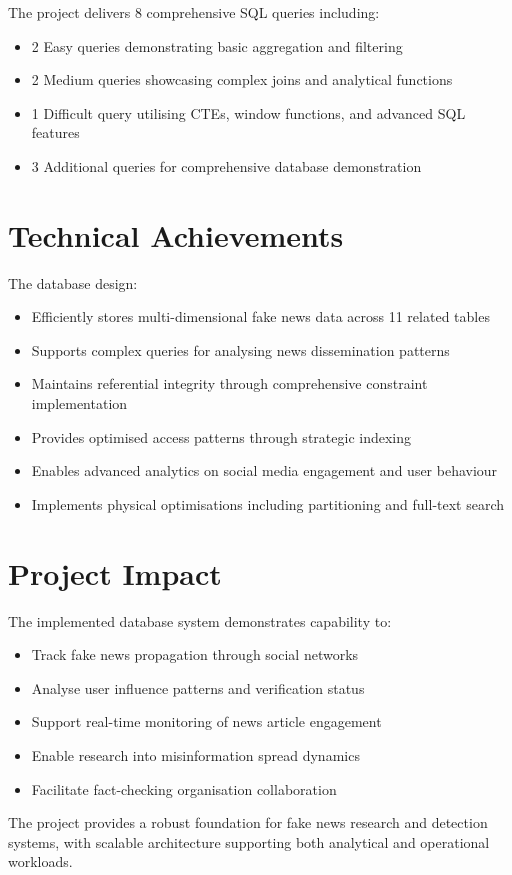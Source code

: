 \documentclass[12pt,a4paper]{report}
\begin{document}
The project delivers 8 comprehensive SQL queries including:
\begin{itemize}
    \item 2 Easy queries demonstrating basic aggregation and filtering
    \item 2 Medium queries showcasing complex joins and analytical functions
    \item 1 Difficult query utilising CTEs, window functions, and advanced SQL features
    \item 3 Additional queries for comprehensive database demonstration
\end{itemize}

\section{Technical Achievements}

The database design:
\begin{itemize}
    \item Efficiently stores multi-dimensional fake news data across 11 related tables
    \item Supports complex queries for analysing news dissemination patterns
    \item Maintains referential integrity through comprehensive constraint implementation
    \item Provides optimised access patterns through strategic indexing
    \item Enables advanced analytics on social media engagement and user behaviour
    \item Implements physical optimisations including partitioning and full-text search
\end{itemize}

\section{Project Impact}

The implemented database system demonstrates capability to:
\begin{itemize}
    \item Track fake news propagation through social networks
    \item Analyse user influence patterns and verification status
    \item Support real-time monitoring of news article engagement
    \item Enable research into misinformation spread dynamics
    \item Facilitate fact-checking organisation collaboration
\end{itemize}

The project provides a robust foundation for fake news research and detection systems, with scalable architecture supporting both analytical and operational workloads.
\end{document}
